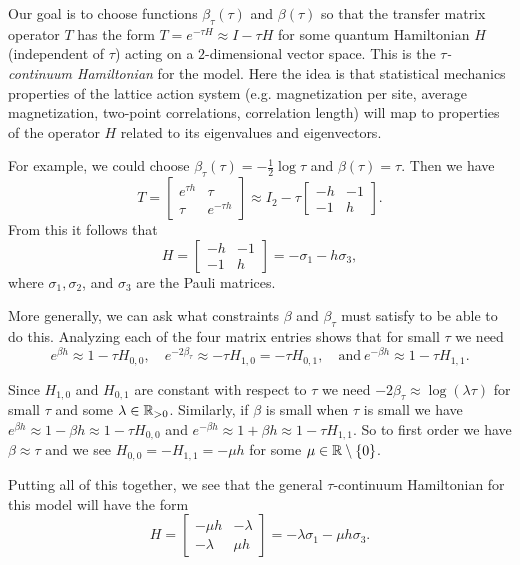 \documentclass[10pt,reqno]{amsart}
\begin{document}
	Our goal is to choose functions $\beta_\tau(\tau)$ and $\beta(\tau)$ so that the transfer matrix operator $T$ has the form $T=e^{-\tau H} \approx I-\tau H$ for some quantum Hamiltonian $H$ (independent of $\tau$) acting on a $2$-dimensional vector space. 
	This is the \emph{$\tau$-continuum Hamiltonian} for the model. 
	Here the idea is that statistical mechanics properties of the lattice action system (e.g. magnetization per site, average magnetization, two-point correlations, correlation length) will map to properties of the operator $H$ related to its eigenvalues and eigenvectors.
	
	For example, we could choose $\beta_\tau(\tau)=-\frac{1}{2}\log \tau$ and $\beta(\tau)=\tau$. Then we have \[T=\begin{bmatrix}
	e^{\tau h} & \tau \\
	\tau & e^{-\tau h}
	\end{bmatrix} \approx I_2-\tau\begin{bmatrix}
	-h & -1 \\
	-1 & h
	\end{bmatrix}.\] 
	From this it follows that \[H=\begin{bmatrix}
	-h & -1 \\
	-1 & h
	\end{bmatrix}=-\sigma_1-h\sigma_3, \] where $\sigma_1,\sigma_2$, and $\sigma_3$ are the Pauli matrices. 
	
	More generally, we can ask what constraints $\beta$ and $\beta_\tau$ must satisfy to be able to do this. 
	Analyzing each of the four matrix entries shows that for small $\tau$ we need 
	\[e^{\beta h} \approx 1-\tau H_{0,0}, \quad e^{-2\beta_\tau} \approx -\tau H_{1,0}=-\tau H_{0,1},\quad \text{and} \ e^{-\beta h} \approx 1- \tau H_{1,1}. \]
	
	Since $H_{1,0}$ and $H_{0,1}$ are constant with respect to $\tau$ we need $-2\beta_\tau \approx \log (\lambda\tau)$ for small $\tau$ and some $\lambda\in \mathbb{R}_{>0}$. 
	Similarly, if $\beta$ is small when $\tau$ is small we have $e^{\beta h} \approx 1-\beta h \approx 1-\tau H_{0,0}$ and $e^{-\beta h} \approx 1+\beta h \approx 1-\tau H_{1,1}$. 
	So to first order we have $\beta \approx \tau$ and we see $H_{0,0}=-H_{1,1}=-\mu h$ for some $\mu \in \mathbb{R}\setminus\{0\}$. 
	
	Putting all of this together, we see that the general $\tau$-continuum Hamiltonian for this model will have the form 
	\[ H=\begin{bmatrix}
	-\mu h & -\lambda \\
	-\lambda & \mu h
	\end{bmatrix}=-\lambda\sigma_1-\mu h\sigma_3.\]
	
\end{document}
